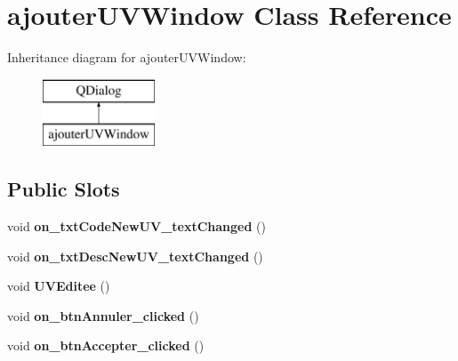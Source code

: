 \hypertarget{classajouter_u_v_window}{\section{ajouter\+U\+V\+Window Class Reference}
\label{classajouter_u_v_window}
}
Inheritance diagram for ajouter\+U\+V\+Window\+:\begin{figure}[H]
\begin{center}
\leavevmode
\includegraphics[height=2.000000cm]{classajouter_u_v_window}
\end{center}
\end{figure}
\subsection*{Public Slots}
\begin{DoxyCompactItemize}
\item 
\hypertarget{classajouter_u_v_window_ae420a5021cc1c808cc1829272a3632de}{void {\bfseries on\+\_\+txt\+Code\+New\+U\+V\+\_\+text\+Changed} ()}\label{classajouter_u_v_window_ae420a5021cc1c808cc1829272a3632de}

\item 
\hypertarget{classajouter_u_v_window_a924f5c0bd03bd28d7837fe3db9349a21}{void {\bfseries on\+\_\+txt\+Desc\+New\+U\+V\+\_\+text\+Changed} ()}\label{classajouter_u_v_window_a924f5c0bd03bd28d7837fe3db9349a21}

\item 
\hypertarget{classajouter_u_v_window_ad670ccb53cdaeb7c07672eec2b3750f6}{void {\bfseries U\+V\+Editee} ()}\label{classajouter_u_v_window_ad670ccb53cdaeb7c07672eec2b3750f6}

\item 
\hypertarget{classajouter_u_v_window_ab91685c4fa6df3f269e00ba5ebf11466}{void {\bfseries on\+\_\+btn\+Annuler\+\_\+clicked} ()}\label{classajouter_u_v_window_ab91685c4fa6df3f269e00ba5ebf11466}

\item 
\hypertarget{classajouter_u_v_window_ab427343ed27b3c809c771c35f6c049b7}{void {\bfseries on\+\_\+btn\+Accepter\+\_\+clicked} ()}\label{classajouter_u_v_window_ab427343ed27b3c809c771c35f6c049b7}

\end{DoxyCompactItemize}

